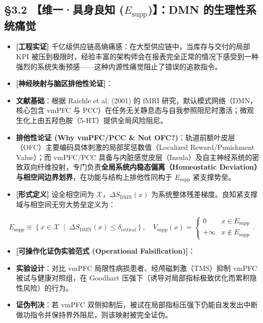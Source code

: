 \documentclass[11pt,a4paper,oneside]{ctexart}
\begin{document}
\subsection{§3.2 【维一·具身良知 ($E_{\text{supp}}$)】：DMN 的生理性系统痛觉}

\begin{itemize}\item \textbf{[工程实证]} 千亿级供应链高熵痛感：在大型供应链中，当库存与交付的局部 KPI 被压到极限时，经验丰富的架构师会在报表完全正常的情况下感受到一种强烈的系统失衡预感------这种内源性痛觉阻止了错误的追款指令。\end{itemize}
\begin{itemize}\item \textbf{[神经映射与脑区排他性论证]}：\end{itemize}
\begin{itemize}\item \textbf{文献基础}：根据 Raichle et al. (2001) 的 fMRI 研究，默认模式网络（DMN，核心包含 vmPFC 与 PCC）在任务无关静息态与自我参照阻尼时激活；微观生化上由五羟色胺（5-HT）提供全局风险阻尼。\end{itemize}
\begin{itemize}\item \textbf{排他性论证 (Why vmPFC/PCC \& Not OFC?)}：轨道前额叶皮层（OFC）主要编码具体刺激的局部奖惩数值（Localized Reward/Punishment Value）；而 vmPFC/PCC 具备与内脏感觉皮层（Insula）及自主神经系统的密致双向纤维投射，专门负责\textbf{全局系统内稳态偏离（Homeostatic Deviation）与相空间边界划界}，在功能与结构上排他性同构于 $E_{\text{supp}}$ 紧支撑势垒。\end{itemize}
\begin{itemize}\item \textbf{[形式定义]} 设全相空间为 $\mathcal{X}$，$\Delta S_{\text{DMN}}(x)$ 为系统整体残差梯度。良知紧支撑域与相空间无穷大势垒定义为：\end{itemize}
\begin{equation}
E_{\text{supp}} \equiv \left\{ x \in \mathcal{X} \;\middle|\; \Delta S_{\text{DMN}}(x) \le \delta_{\text{critical}} \right\}, \quad V_{\text{supp}}(x) = \begin{cases} 0 & x \in E_{\text{supp}} \\ +\infty & x \notin E_{\text{supp}} \end{cases}.
\end{equation}
\begin{itemize}\item \textbf{[可操作化证伪实验范式 (Operational Falsification)]}：\end{itemize}
\begin{itemize}\item \textbf{实验设计}：对比 vmPFC 局限性病损患者、经颅磁刺激（TMS）抑制 vmPFC 被试与健康对照组，在 Goodhart 压强下（诱导对局部指标极致优化而累积隐性风险）的行为。\end{itemize}
\begin{itemize}\item \textbf{证伪判决}：若 vmPFC 双侧抑制后，被试在局部指标压强下仍能自发发出中断做功指令并保持界外阻尼，则该映射被完全证伪。\end{itemize}
\end{document}
